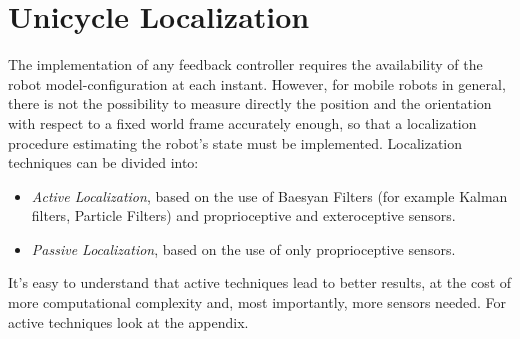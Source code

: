 \section{Unicycle Localization}
The implementation of any feedback controller requires the availability of the robot model-configuration at each instant. However, for mobile robots in general, there is not the possibility to measure directly the position and the orientation with respect to a fixed world frame accurately enough, so that a localization procedure estimating the robot’s state must be implemented. Localization techniques can be divided into:
\begin{itemize}
    \item \textit{Active Localization}, based on the use of  Baesyan Filters (for example Kalman filters, Particle Filters) and proprioceptive and exteroceptive sensors.
    \item \textit{Passive Localization}, based on the use of only proprioceptive sensors.
\end{itemize}
It's easy to understand that active techniques lead to better results, at the cost of more computational complexity and, most importantly, more sensors needed. For active techniques look at the appendix.
